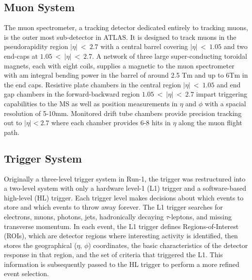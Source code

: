 \subsection{Muon System}
The muon spectrometer, a tracking detector dedicated entirely to tracking muons, is the outer most sub-detector in ATLAS.  It is designed to track muons in the pseudorapidity region $|\eta|~<~2.7$ with a central barrel covering $|\eta|~<~1.05$ and two end-caps at $1.05~<~|\eta|~<~2.7$.  A network of three large super-conducting toroidal magnets, each with eight coils, supplies a magnetic to the muon spectrometer with am integral bending power in the barrel of around 2.5 Tm and up to 6Tm in the end caps.  Resistive plate chambers in the central region $|\eta|~<~1.05$ and end gap chambers in the forward-backward region $1.05~<~|\eta|~<~2.7$ impart triggering capabilities to the MS as well as position measurements in $\eta$ and $\phi$ with a spacial resolution of 5-10mm. Monitored drift tube chambers provide precision tracking out to $|\eta| < 2.7$ where each chamber provides 6-8 hits in $\eta$ along the muon flight path. 

\iffalse
\subsection{Trigger and DAQ}
\textcolor{blue}{Timing and  trigger control logic, the TDAQ system is complex computing system to acquire and store data.  It is partitioned into sub-systems that are typically affiliated with with sub-detectors that have the same logic components and building blocks.}  \fi
\subsection{Trigger System}
Originally a three-level trigger system in Run-1, the trigger was restructured into a two-level system with only a hardware level-1 (L1) trigger and a software-based high-level (HL) trigger.  Each trigger level makes decisions about which events to store and which events to throw away forever.
The L1 trigger searches for electrons, muons, photons, jets, hadronically decaying $\tau$-leptons, and missing transverse momentum.  In each event, the L1 trigger defines Regions-of-Interest (ROIs), which are detector regions where interesting activity is identified, then stores the geographical ($\eta$, $\phi$) coordinates, the basic characteristics of the detector response in that region, and the set of criteria that triggered the L1.  This information is subsequently passed to the HL trigger to perform a more refined event selection.

